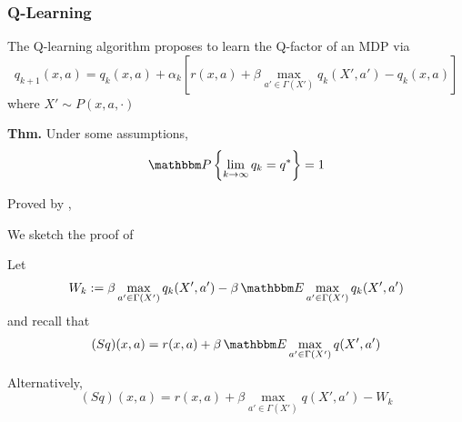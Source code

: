 \documentclass[xcolor=dvipsnames]{beamer}  %
\newcommand{\1}{\mathbbm 1}
\newcommand{\PP}{\mathbbm P}
\newcommand{\EE}{\mathbbm E}
\begin{document}
\begin{frame}
    \frametitle{Q-Learning}

    The Q-learning algorithm \cite{watkins1989learning} proposes to learn the Q-factor of an MDP
    via
    \begin{equation*}
        q_{k+1}(x,a) 
        = q_k(x,a) + \alpha_k 
        \left[
            r(x,a) + \beta \max_{a' \in \Gamma(X')} q_k(X', a')
            - q_k(x,a)
        \right]
    \end{equation*}
    where $X' \sim P(x, a, \cdot)$

            \vspace{0.5em}
            \vspace{0.5em}
    {\bf Thm.} Under some assumptions, 
    \begin{equation*}
        \PP
        \left\{
            \lim_{k \to \infty}
            q_k = q^*
        \right\} = 1
    \end{equation*}

    Proved by \cite{tsitsiklis1994asynchronous}, \cite{watkins1992q}

\end{frame}

\begin{frame}

    We sketch the proof of \cite{tsitsiklis1994asynchronous}
    
            \vspace{0.5em}
    Let
    \begin{equation*}
        W_k 
        := \beta \max_{a' \in \Gamma(X')} q_k(X', a') 
        - \beta \, \EE \max_{a' \in \Gamma(X')} q_k(X', a')
    \end{equation*}
    and recall that
    \begin{equation*}
        (S q)(x,a)
        =  r(x, a) + \beta \,\EE \max_{a' \in \Gamma(X')} q(X',a')
    \end{equation*}

            \vspace{0.5em}
            \vspace{0.5em}
    Alternatively,
    \begin{equation*}
        (S q)(x,a)
        =  r(x, a) + \beta \max_{a' \in \Gamma(X')} q(X',a') - W_k
    \end{equation*}

\end{frame}
\end{document}
